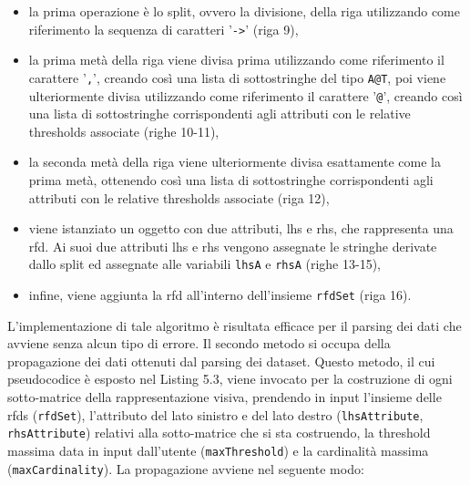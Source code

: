 \begin{itemize}
    \item la prima operazione \`{e} lo split, ovvero la divisione, della riga utilizzando come riferimento la sequenza di caratteri '\texttt{->}' (riga 9),
    \item la prima met\`{a} della riga viene divisa prima utilizzando come riferimento il carattere '\texttt{,}', creando cos\`{i} una lista di sottostringhe del tipo \texttt{A@T}, poi viene ulteriormente divisa utilizzando come riferimento il carattere '\texttt{@}', creando cos\`{i} una lista di sottostringhe corrispondenti agli attributi con le relative thresholds associate (righe 10-11),
    \item la seconda met\`{a} della riga viene ulteriormente divisa esattamente come la prima met\`{a}, ottenendo cos\`{i} una lista di sottostringhe corrispondenti agli attributi con le relative thresholds associate (riga 12),
    \item viene istanziato un oggetto con due attributi, lhs e rhs, che rappresenta una \acrshort{rfd}. Ai suoi due attributi lhs e rhs vengono assegnate le stringhe derivate dallo split ed assegnate alle variabili \texttt{lhsA} e \texttt{rhsA} (righe 13-15),
    \item infine, viene aggiunta la \acrshort{rfd} all'interno dell'insieme \texttt{rfdSet} (riga 16).
\end{itemize}
L'implementazione di tale algoritmo \`{e} risultata efficace per il parsing dei dati che avviene senza alcun tipo di errore. Il secondo metodo si occupa della propagazione dei dati ottenuti dal parsing dei dataset. Questo metodo, il cui pseudocodice \`{e} esposto nel Listing 5.3, viene invocato per la costruzione di ogni sotto-matrice della rappresentazione visiva, prendendo in input l'insieme delle \acrshort{rfds} (\texttt{rfdSet}), l'attributo del lato sinistro e del lato destro (\texttt{lhsAttribute}, \texttt{rhsAttribute}) relativi alla sotto-matrice che si sta costruendo, la threshold massima data in input dall'utente (\texttt{maxThreshold}) e la cardinalit\`{a} massima (\texttt{maxCardinality}). La propagazione avviene nel seguente modo:
